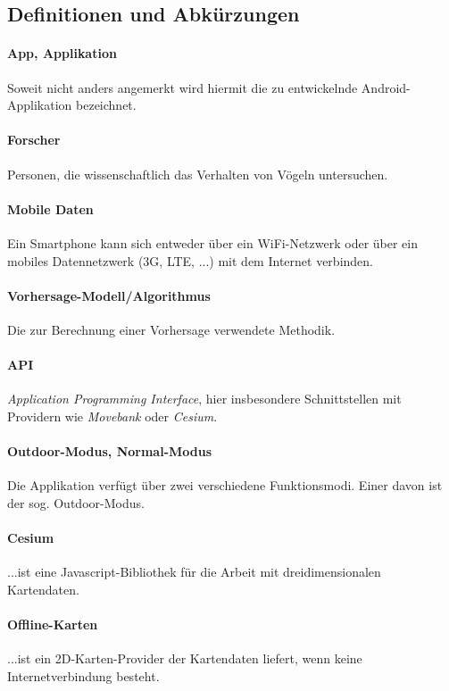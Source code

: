 \documentclass[12pt]{article} %
\begin{document}



\subsection{Definitionen und Abkürzungen}

	\paragraph{App, Applikation} Soweit nicht anders angemerkt wird hiermit die zu entwickelnde Android-Applikation bezeichnet.
	 \paragraph{Forscher} Personen, die wissenschaftlich das Verhalten von Vögeln untersuchen.
	 \paragraph{Mobile Daten} Ein Smartphone kann sich entweder über ein WiFi-Netzwerk oder über ein mobiles Datennetzwerk (3G, LTE, ...) mit dem Internet verbinden. 
	\paragraph{Vorhersage-Modell/Algorithmus} Die zur Berechnung einer Vorhersage verwendete Methodik. 
	\paragraph{API} \textit{Application Programming Interface}, hier insbesondere Schnittstellen mit Providern wie \textit{Movebank} oder \textit{Cesium}. 
	\paragraph{Outdoor-Modus, Normal-Modus} Die Applikation verfügt über zwei verschiedene Funktionsmodi. Einer davon ist der sog. Outdoor-Modus.
	\paragraph{Cesium} ...ist eine Javascript-Bibliothek für die Arbeit mit dreidimensionalen Kartendaten.
	\paragraph{Offline-Karten} ...ist ein 2D-Karten-Provider der Kartendaten liefert, wenn keine Internetverbindung besteht.
\end{document}
